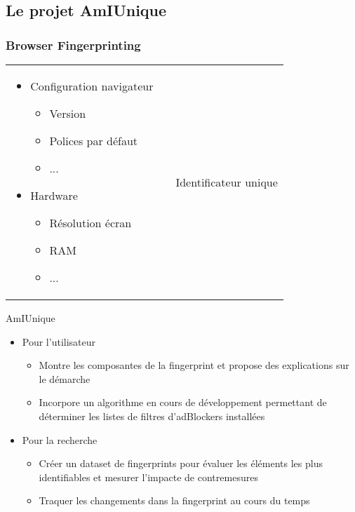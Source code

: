 \documentclass{beamer}
\begin{document}
	\subsection{Le projet AmIUnique}
	\begin{frame}
		\frametitle{Browser Fingerprinting}
		\begin{tabular}{m{} m{} m{}}
			\begin{itemize}
				\item Configuration navigateur
					\begin{itemize}
						\item Version
						\item Polices par défaut
						\item ... 
					\end{itemize}
				\item Hardware
					\begin{itemize}
						\item Résolution écran
						\item RAM
						\item ... 
					\end{itemize}
			\end{itemize} & \huge \textrightarrow & Identificateur unique
		\end{tabular}
	\end{frame}

	\begin{frame}{AmIUnique}
		\begin{itemize}
			\item Pour l'utilisateur
			\begin{itemize}
				\item Montre les composantes de la fingerprint et propose des explications sur le démarche
				\color{lightgray}
				\item Incorpore un algorithme en cours de développement permettant de déterminer  les listes de filtres d'adBlockers installées
			\end{itemize}
			\color{lightgray}
			\item Pour la recherche
			\begin{itemize}
				\color{lightgray}
				\item Créer un dataset de fingerprints pour évaluer les éléments les plus identifiables et mesurer l'impacte de contremesures
				\item Traquer les changements dans la fingerprint au cours du temps
			\end{itemize}
		\end{itemize}
	\end{frame}
\end{document}
